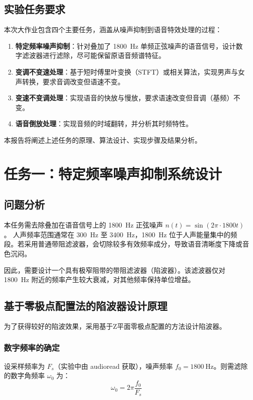 \documentclass[12pt]{ctexart}
\begin{document}
\subsection{实验任务要求}
本次大作业包含四个主要任务，涵盖从噪声抑制到语音特效处理的过程：
\begin{enumerate}
    \item \textbf{特定频率噪声抑制}：针对叠加了 \SI{1800}{\hertz} 单频正弦噪声的语音信号，设计数字滤波器进行滤除，尽可能保留原语音频谱特征。
    \item \textbf{变调不变速处理}：基于短时傅里叶变换（STFT）或相关算法，实现男声与女声转换，要求音调改变但语速不变。
    \item \textbf{变速不变调处理}：实现语音的快放与慢放，要求语速改变但音调（基频）不变。
    \item \textbf{语音倒放处理}：实现音频的时域翻转，并分析其时频特性。
\end{enumerate}

本报告将阐述上述任务的原理、算法设计、实现步骤及结果分析。

\newpage


\section{任务一：特定频率噪声抑制系统设计}

\subsection{问题分析}
本任务需去除叠加在语音信号上的 \SI{1800}{\hertz} 正弦噪声 $n(t) = \sin(2\pi \cdot 1800 t)$。
人声频率范围通常在 \SI{300}{\hertz} 至 \SI{3400}{\hertz}，\SI{1800}{\hertz} 位于人声能量集中的频段。若采用普通带阻滤波器，会切除较多有效频率成分，导致语音清晰度下降或音色沉闷。

因此，需要设计一个具有极窄阻带的带阻滤波器（陷波器）。该滤波器仅对 \SI{1800}{\hertz} 附近的频率产生较大衰减，对其他频率保持单位增益。

\subsection{基于零极点配置法的陷波器设计原理}
为了获得较好的陷波效果，采用基于Z平面零极点配置的方法设计陷波器。

\subsubsection{数字频率的确定}
设采样频率为 $F_s$（实验中由 audioread 获取），噪声频率 $f_0 = \SI{1800}{\hertz}$。则需滤除的数字角频率 $\omega_0$ 为：
\begin{equation}
    \omega_0 = 2\pi \frac{f_0}{F_s}
\end{equation}
\end{document}
